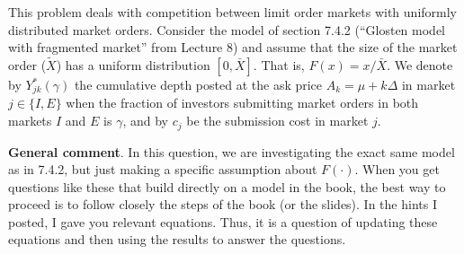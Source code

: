 \documentclass[11pt
, answers
]{exam}
\begin{document}
This problem deals with competition between limit order markets with uniformly distributed market orders. Consider the model of section 7.4.2 (``Glosten model with fragmented market'' from Lecture 8) and assume that the size of the market order ($\tilde{X}$) has a uniform distribution $[0,\bar{X}]$. That is, $F(x)=x/{\bar{X}}$. We denote by $Y^{*}_{jk}(\gamma)$ the cumulative depth posted at the ask price $A_{k}=\mu+k\Delta$ in market $j \in \{I,E\}$ when the fraction of investors submitting market orders in both markets $I$ and $E$ is $\gamma$, and by $c_{j}$ be the submission cost in market $j$.

\begin{solution}
	\noindent \textbf{General comment}. In this question, we are investigating the exact same model as in 7.4.2, but just making a specific assumption about $F(\cdot)$. When you get questions like these that build directly on a model in the book, the best way to proceed is to follow closely the steps of the book (or the slides). In the hints I posted, I gave you relevant equations. Thus, it is a question of updating these equations and then using the results to answer the questions.
\end{solution}
\end{document}
